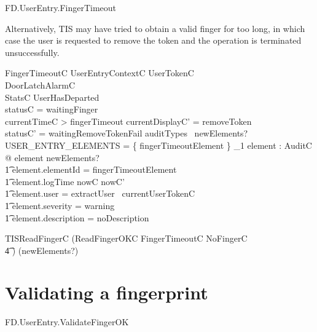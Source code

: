 \begin{traceunit}{FD.UserEntry.FingerTimeout}
\end{traceunit}

Alternatively, TIS may have tried to obtain a valid finger for too
long, in which case the user is requested to remove the token and 
the operation is terminated unsuccessfully. 


\begin{schema}{FingerTimeoutC}
        UserEntryContextC
\also
        \Xi UserTokenC
\\      \Xi DoorLatchAlarmC
\\      \Xi StatsC       
\where
        \lnot UserHasDeparted
\\        statusC = waitingFinger
\\      currentTimeC > fingerTimeout
\also
        currentDisplayC' = removeToken
\\      statusC' = waitingRemoveTokenFail
\also
        auditTypes~ newElements? \cap USER\_ENTRY\_ELEMENTS = 
        \{ fingerTimeoutElement \} 
\also
        \exists_1 element : AuditC @ element \in newElements? 
\\ \t1  \land element.elementId = fingerTimeoutElement
\\ \t1  \land element.logTime \in nowC \upto nowC'
\\ \t1  \land element.user = extractUser~ currentUserTokenC
\\ \t1  \land element.severity = warning
\\ \t1  \land element.description = noDescription
\end{schema}

\begin{zed}
        TISReadFingerC  (ReadFingerOKC \lor
        FingerTimeoutC \lor NoFingerC 
\\ \t4  \lor [~ UserTokenTornC | statusC = waitingFinger ~]) \hide (newElements?)
\end{zed}

\section{Validating a fingerprint}

\begin{traceunit}{FD.UserEntry.ValidateFingerOK}
\end{traceunit}

